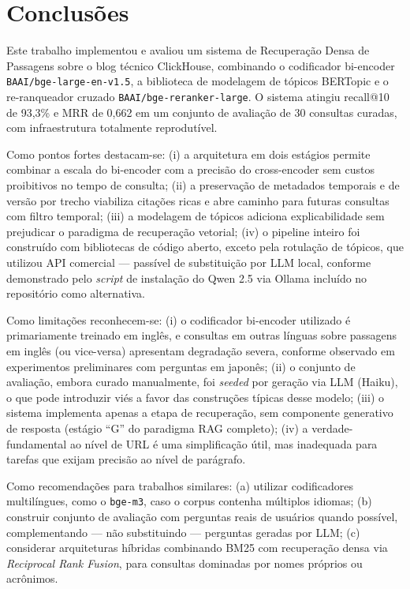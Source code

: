 \documentclass[11pt,a4paper]{article}
\begin{document}
\section{Conclusões}

Este trabalho implementou e avaliou um sistema de Recuperação Densa de Passagens sobre o blog técnico ClickHouse, combinando o codificador bi-encoder \texttt{BAAI/bge-large-en-v1.5}, a biblioteca de modelagem de tópicos BERTopic e o re-ranqueador cruzado \texttt{BAAI/bge-reranker-large}. O sistema atingiu recall@10 de 93,3\% e MRR de 0,662 em um conjunto de avaliação de 30 consultas curadas, com infraestrutura totalmente reprodutível.

Como pontos fortes destacam-se: (i) a arquitetura em dois estágios permite combinar a escala do bi-encoder com a precisão do cross-encoder sem custos proibitivos no tempo de consulta; (ii) a preservação de metadados temporais e de versão por trecho viabiliza citações ricas e abre caminho para futuras consultas com filtro temporal; (iii) a modelagem de tópicos adiciona explicabilidade sem prejudicar o paradigma de recuperação vetorial; (iv) o pipeline inteiro foi construído com bibliotecas de código aberto, exceto pela rotulação de tópicos, que utilizou API comercial --- passível de substituição por LLM local, conforme demonstrado pelo \textit{script} de instalação do Qwen 2.5 via Ollama incluído no repositório como alternativa.

Como limitações reconhecem-se: (i) o codificador bi-encoder utilizado é primariamente treinado em inglês, e consultas em outras línguas sobre passagens em inglês (ou vice-versa) apresentam degradação severa, conforme observado em experimentos preliminares com perguntas em japonês; (ii) o conjunto de avaliação, embora curado manualmente, foi \textit{seeded} por geração via LLM (Haiku), o que pode introduzir viés a favor das construções típicas desse modelo; (iii) o sistema implementa apenas a etapa de recuperação, sem componente generativo de resposta (estágio ``G'' do paradigma RAG completo); (iv) a verdade-fundamental ao nível de URL é uma simplificação útil, mas inadequada para tarefas que exijam precisão ao nível de parágrafo.

Como recomendações para trabalhos similares: (a) utilizar codificadores multilíngues, como o \texttt{bge-m3}, caso o corpus contenha múltiplos idiomas; (b) construir conjunto de avaliação com perguntas reais de usuários quando possível, complementando --- não substituindo --- perguntas geradas por LLM; (c) considerar arquiteturas híbridas combinando BM25 com recuperação densa via \textit{Reciprocal Rank Fusion}, para consultas dominadas por nomes próprios ou acrônimos.
\end{document}

